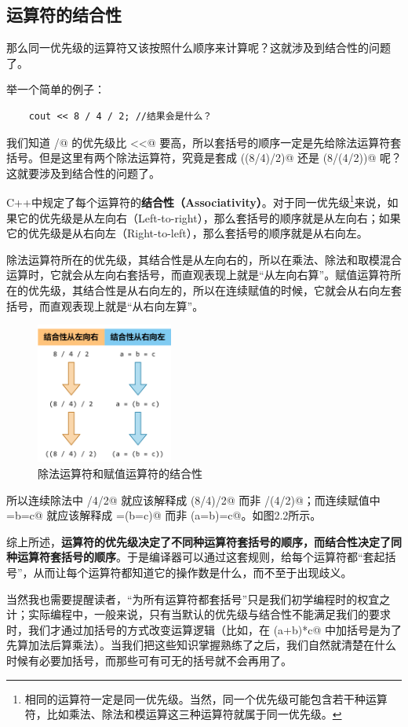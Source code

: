 \subsection*{运算符的结合性}
那么同一优先级的运算符又该按照什么顺序来计算呢？这就涉及到结合性的问题了。\par
举一个简单的例子：
\begin{lstlisting}
    cout << 8 / 4 / 2; //结果会是什么？
\end{lstlisting}
我们知道 \lstinline@/@ 的优先级比 \lstinline@<<@ 要高，所以套括号的顺序一定是先给除法运算符套括号。但是这里有两个除法运算符，究竟是套成 \lstinline@((8/4)/2)@ 还是 \lstinline@(8/(4/2))@ 呢？这就要涉及到结合性的问题了。\par
C++中规定了每个运算符的\textbf{结合性（Associativity）}。对于同一优先级\footnote{相同的运算符一定是同一优先级。当然，同一个优先级可能包含若干种运算符，比如乘法、除法和模运算这三种运算符就属于同一优先级。}来说，如果它的优先级是从左向右（Left-to-right），那么套括号的顺序就是从左向右；如果它的优先级是从右向左（Right-to-left），那么套括号的顺序就是从右向左。\par
除法运算符所在的优先级，其结合性是从左向右的，所以在乘法、除法和取模混合运算时，它就会从左向右套括号，而直观表现上就是``从左向右算''。赋值运算符所在的优先级，其结合性是从右向左的，所以在连续赋值的时候，它就会从右向左套括号，而直观表现上就是``从右向左算''。\par
\begin{figure}[htbp]
    \centering
    \includegraphics[width=0.4\textwidth]{../images/generalized_parts/02_Associativity_of_division_and_assignment.drawio.png}
    \caption{除法运算符和赋值运算符的结合性}
\end{figure}
所以连续除法中 /4/2@ 就应该解释成 \lstinline@(8/4)/2@ 而非 /(4/2)@；而连续赋值中 \lstinline@a=b=c@ 就应该解释成 \lstinline@a=(b=c)@ 而非 \lstinline@(a=b)=c@。如图2.2所示。\par
综上所述，\textbf{运算符的优先级决定了不同种运算符套括号的顺序，而结合性决定了同种运算符套括号的顺序}。于是编译器可以通过这套规则，给每个运算符都``套起括号''，从而让每个运算符都知道它的操作数是什么，而不至于出现歧义。\par
当然我也需要提醒读者，``为所有运算符都套括号''只是我们初学编程时的权宜之计；实际编程中，一般来说，只有当默认的优先级与结合性不能满足我们的要求时，我们才通过加括号的方式改变运算逻辑（比如，在 \lstinline@(a+b)*c@ 中加括号是为了先算加法后算乘法）。当我们把这些知识掌握熟练了之后，我们自然就清楚在什么时候有必要加括号，而那些可有可无的括号就不会再用了。\par

